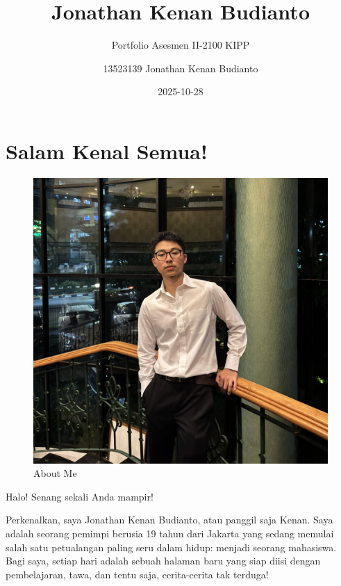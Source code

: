 \documentclass[
  letterpaper,
  DIV=11,
  numbers=noendperiod]{scrreprt}
\title{Jonathan Kenan Budianto}
\subtitle{Portfolio Asesmen II-2100 KIPP}
\author{13523139 Jonathan Kenan Budianto}
\date{2025-10-28}
\renewcommand*\contentsname{Table of contents}
\newcommand\contentsname{Table of contents}
\begin{document}
\maketitle

\renewcommand*\contentsname{Table of contents}
{
\hypersetup{linkcolor=}
\setcounter{tocdepth}{2}
\tableofcontents
}


\chapter*{Salam Kenal Semua!}\label{salam-kenal-semua}


\begin{figure}[H]

{\centering \includegraphics[width=1\linewidth,height=\textheight,keepaspectratio]{images/oks.jpg}

}

\caption{About Me}

\end{figure}%

Halo! Senang sekali Anda mampir!

Perkenalkan, saya Jonathan Kenan Budianto, atau panggil saja Kenan. Saya
adalah seorang pemimpi berusia 19 tahun dari Jakarta yang sedang memulai
salah satu petualangan paling seru dalam hidup: menjadi seorang
mahasiswa. Bagi saya, setiap hari adalah sebuah halaman baru yang siap
diisi dengan pembelajaran, tawa, dan tentu saja, cerita-cerita tak
terduga!
\end{document}
